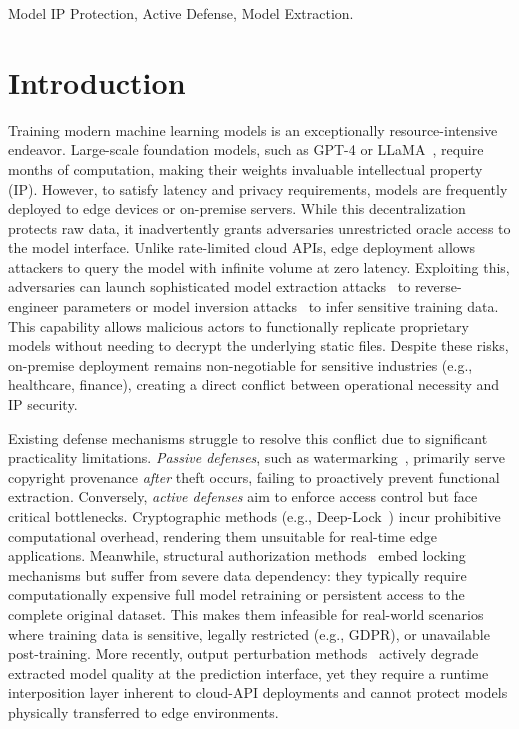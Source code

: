 \documentclass[conference]{IEEEtran}
\begin{document}
\begin{IEEEkeywords}
Model IP Protection, Active Defense, Model Extraction.
\end{IEEEkeywords}

\section{Introduction}

Training modern machine learning models is an exceptionally resource-intensive endeavor. Large-scale foundation models, such as GPT-4 or LLaMA~\cite{openai2024gpt4,touvron2023llama}, require months of computation, making their weights invaluable intellectual property (IP). However, to satisfy latency and privacy requirements, models are frequently deployed to edge devices or on-premise servers. While this decentralization protects raw data, it inadvertently grants adversaries unrestricted oracle access to the model interface. Unlike rate-limited cloud APIs, edge deployment allows attackers to query the model with infinite volume at zero latency. Exploiting this, adversaries can launch sophisticated model extraction attacks~\cite{tramer2016stealing, jagielski2020high} to reverse-engineer parameters or model inversion attacks~\cite{fredrikson2015model} to infer sensitive training data. This capability allows malicious actors to functionally replicate proprietary models without needing to decrypt the underlying static files. Despite these risks, on-premise deployment remains non-negotiable for sensitive industries (e.g., healthcare, finance), creating a direct conflict between operational necessity and IP security.

Existing defense mechanisms struggle to resolve this conflict due to significant practicality limitations. \textit{Passive defenses}, such as watermarking~\cite{adi2018turning,uchida2017embedding,zhang2018protecting}, primarily serve copyright provenance \textit{after} theft occurs, failing to proactively prevent functional extraction. Conversely, \textit{active defenses} aim to enforce access control but face critical bottlenecks. Cryptographic methods (e.g., Deep-Lock~\cite{alam2020deeplock}) incur prohibitive computational overhead, rendering them unsuitable for real-time edge applications. Meanwhile, structural authorization methods~\cite{chen2021model,xue2024ssat,xue2021advparams} embed locking mechanisms but suffer from severe data dependency: they typically require computationally expensive full model retraining or persistent access to the complete original dataset. This makes them infeasible for real-world scenarios where training data is sensitive, legally restricted (e.g., GDPR), or unavailable post-training. More recently, output perturbation methods~\cite{orekondy2020prediction,zhang2023cip} actively degrade extracted model quality at the prediction interface, yet they require a runtime interposition layer inherent to cloud-API deployments and cannot protect models physically transferred to edge environments.
\end{document}
